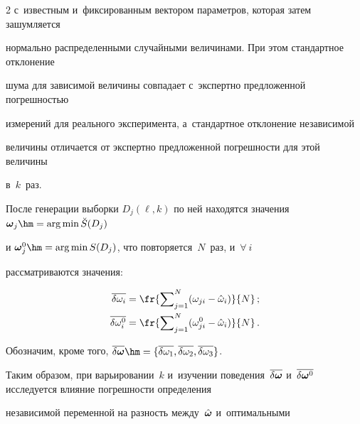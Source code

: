 \begin{multicols}{2}
с~известным и~фиксированным вектором параметров, которая затем зашумляется 

нормально распределенными случайными величинами. При этом стандартное отклонение

шума для зависимой величины совпадает с~экспертно предложенной погрешностью

измерений для реального эксперимента, а~стандартное отклонение независимой

величины отличается от экспертно предложенной погрешности для этой величины

в~$k$~раз.



После генерации выборки $D_j(\ell, k)$ по ней находятся значения $\bomega_j \hm= 

\arg \min \breve{S}(D_j)$

и $\bomega_j^0 \hm= \arg \min S(D_j)$, что повторяется~$N$~раз, и~$\forall\ i$ 

рассматриваются значения:



\noindent

\begin{align*}

  \overline{\delta \omega_i} &= \fr{\sum\nolimits_{j = 1}^N (\omega_{ji} - 

\hat{\omega}_i)}{N}\,;

\\

  \overline{\delta \omega^0_i} &= \fr{\sum\nolimits_{j = 1}^N (\omega^0_{ji} - 

\hat{\omega}_i)}{N}\,.

\end{align*}



\vspace*{-4pt}



Обозначим, кроме того, $\overline{\delta \bomega} \hm= \{ \overline{\delta 

\omega_1}, \overline{\delta \omega_2}, \overline{\delta \omega_3} \}$.



Таким образом, при варьировании~$k$ и~изуче\-нии поведения~$\overline{\delta 

\bomega}$ и~$\overline{\delta \bomega^0}$ исследуется влияние по\-греш\-ности определения

независимой переменной на раз\-ность между~$\hat{\boldsymbol{\omega}}$ и~оптимальными


\end{multicols}
